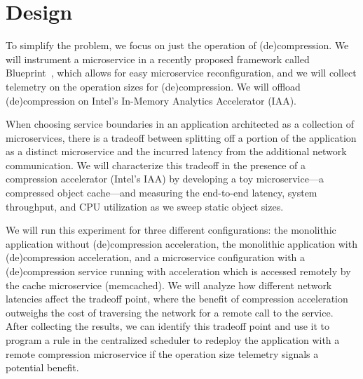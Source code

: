 \section{Design}

To simplify the problem, we focus on just the operation of (de)compression.
We will instrument a microservice in a recently proposed framework called Blueprint~\cite{anand2023blueprint}, which allows for easy microservice reconfiguration, and we will collect telemetry on the operation sizes for (de)compression.
We will offload (de)compression on Intel's In-Memory Analytics Accelerator (IAA).

When choosing service boundaries in an application architected as a collection of microservices, there is a tradeoff between splitting off a portion of the application as a distinct microservice and the incurred latency from the additional network communication.
We will characterize this tradeoff in the presence of a compression accelerator (Intel's IAA) by developing a toy microservice---a compressed object cache---and measuring the end-to-end latency, system throughput, and CPU utilization as we sweep static object sizes.

We will run this experiment for three different configurations: the monolithic application without (de)compression acceleration, the monolithic application with (de)compression acceleration, and a microservice configuration with a (de)compression service running with acceleration which is accessed remotely by the cache microservice (memcached).
We will analyze how different network latencies affect the tradeoff point, where the benefit of compression acceleration outweighs the cost of traversing the network for a remote call to the service.
After collecting the results, we can identify this tradeoff point and use it to program a rule in the centralized scheduler to redeploy the application with a remote compression microservice if the operation size telemetry signals a potential benefit.
